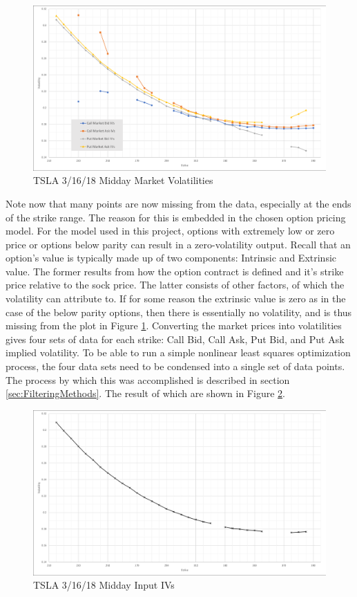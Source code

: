 \documentclass[12pt, a4paper, notitlepage]{article}
\numberwithin{equation}{subsection}
\numberwithin{figure}{subsection}
\numberwithin{table}{subsection}
\newcommand{\newpar}{\newline \newline}
\begin{document}
\begin{figure}[H]
	\caption{TSLA 3/16/18 Midday Market Volatilities}
	\centerline{\includegraphics[width=1\textwidth]{SampleOptionMarketIVs}}
	\label{fig:SampleOptionMarketIVs}
\end{figure}

Note now that many points are now missing from the data, especially at the ends of the strike range.  The reason for this is embedded in the chosen option pricing model.  For the model used in this project, options with extremely low or zero price or options below parity can result in a zero-volatility output.  Recall that an option's value is typically made up of two components:  Intrinsic and Extrinsic value.  The former results from how the option contract is defined and it's strike price relative to the sock price.  The latter consists of other factors, of which the volatility can attribute to.  If for some reason the extrinsic value is zero as in the case of the below parity options, then there is essentially no volatility, and is thus missing from the plot in Figure \ref{fig:SampleOptionMarketIVs}.
\newpar
Converting the market prices into volatilities gives four sets of data for each strike:  Call Bid, Call Ask, Put Bid, and Put Ask implied volatility.  To be able to run a simple nonlinear least squares optimization process, the four data sets need to be condensed into a single set of data points.  The process by which this was accomplished is described in section \ref{sec:FilteringMethods}.  The result of which are shown in Figure \ref{fig:SampleInputIvs}.

\begin{figure}[H]
	\caption{TSLA 3/16/18 Midday Input IVs}
	\centerline{\includegraphics[width=1\textwidth]{SampleInputIvs}}
	\label{fig:SampleInputIvs}
\end{figure}
\end{document}
